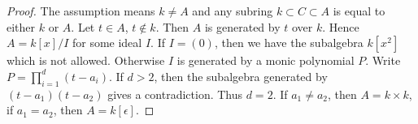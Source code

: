 \documentclass{stacks-project}
\theoremstyle{plain}
\theoremstyle{definition}
\theoremstyle{remark}
\numberwithin{equation}{subsection}
\begin{document}
\begin{proof}
The assumption means $k \not = A$ and any subring $k \subset C \subset A$
is equal to either $k$ or $A$. Let $t \in A$, $t \not \in k$.
Then $A$ is generated by $t$ over $k$. Hence $A = k[x]/I$ for some
ideal $I$. If $I = (0)$, then we have the subalgebra $k[x^2]$
which is not allowed. Otherwise $I$ is generated by a monic polynomial $P$.
Write $P = \prod_{i = 1}^d (t - a_i)$. If $d > 2$, then the subalgebra
generated by $(t - a_1)(t - a_2)$ gives a contradiction.
Thus $d = 2$. If $a_1 \not = a_2$, then $A = k \times k$,
if $a_1 = a_2$, then $A = k[\epsilon]$.
\end{proof}
\end{document}
